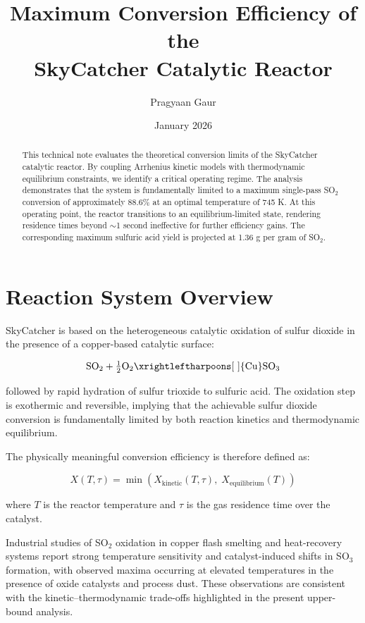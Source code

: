 \documentclass[a4paper,11pt]{article}
\title{\textbf{Maximum Conversion Efficiency of the \\ SkyCatcher Catalytic Reactor}}
\author{Pragyaan Gaur}
\date{January 2026}
\begin{document}
\maketitle
\thispagestyle{empty}

\begin{abstract}
This technical note evaluates the theoretical conversion limits of the SkyCatcher catalytic reactor. By coupling Arrhenius kinetic models with thermodynamic equilibrium constraints, we identify a critical operating regime. The analysis demonstrates that the system is fundamentally limited to a maximum single-pass SO$_2$ conversion of approximately 88.6\% at an optimal temperature of 745 K. At this operating point, the reactor transitions to an equilibrium-limited state, rendering residence times beyond $\sim$1 second ineffective for further efficiency gains. The corresponding maximum sulfuric acid yield is projected at 1.36 g per gram of SO$_2$.
\end{abstract}

\section{Reaction System Overview}

SkyCatcher is based on the heterogeneous catalytic oxidation of sulfur dioxide in the presence of a copper-based catalytic surface:

\begin{equation}
\mathrm{SO_2 + \tfrac{1}{2}O_2 \xrightleftharpoons[\ ]{\mathrm{Cu}} SO_3}
\end{equation}

followed by rapid hydration of sulfur trioxide to sulfuric acid. The oxidation step is exothermic and reversible, implying that the achievable sulfur dioxide conversion is fundamentally limited by both reaction kinetics and thermodynamic equilibrium.

The physically meaningful conversion efficiency is therefore defined as:

\begin{equation}
X(T,\tau) = \min\!\left(X_{\mathrm{kinetic}}(T,\tau),\; X_{\mathrm{equilibrium}}(T)\right)
\end{equation}

where $T$ is the reactor temperature and $\tau$ is the gas residence time over the catalyst.

Industrial studies of SO$_2$ oxidation in copper flash smelting and heat-recovery systems report strong temperature sensitivity and catalyst-induced shifts in SO$_3$ formation, with observed maxima occurring at elevated temperatures in the presence of oxide catalysts and process dust. These observations are consistent with the kinetic–thermodynamic trade-offs highlighted in the present upper-bound analysis.
\end{document}
